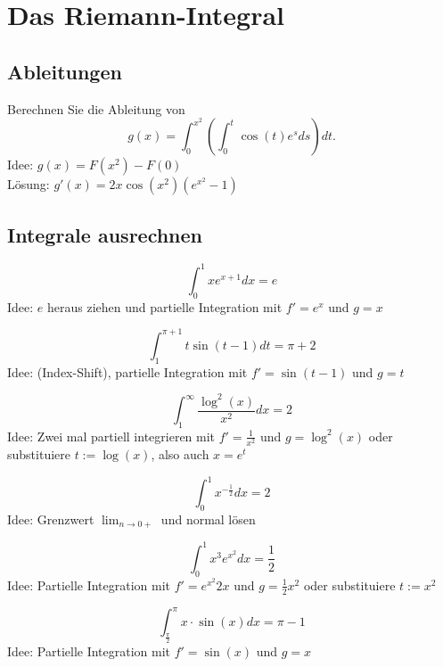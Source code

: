 \section{Das Riemann-Integral}

\subsection{Ableitungen}
Berechnen Sie die Ableitung von
\begin{displaymath}
  g(x) = \int_{0}^{x^2} \left(\int_{0}^{t} \cos(t)e^s ds\right)dt.
\end{displaymath}
Idee: $g(x) = F(x^2) - F(0)$\\
Lösung: $g'(x) = 2x \cos(x^2) \left(e^{x^2} - 1\right)$

\subsection{Integrale ausrechnen}
\begin{displaymath}
  \int_{0}^{1} xe^{x + 1} dx = e
\end{displaymath}
Idee: $e$ heraus ziehen und partielle Integration mit $f' = e^x$ und $g = x$

\begin{displaymath}            
  \int_{1}^{\pi + 1} t\sin(t - 1)dt = \pi + 2                                   
\end{displaymath}
Idee: (Index-Shift), partielle Integration mit $f' = \sin(t - 1)$ und $g = t$

\begin{displaymath}
  \int_{1}^{\infty} \frac{\log^2(x)}{x^2} dx = 2
\end{displaymath}
Idee: Zwei mal partiell integrieren mit $f' = \frac{1}{x^2}$ und $g = \log^2(x)$ oder substituiere $t := \log(x)$, also auch $x = e^t$

\begin{displaymath}
  \int_{0}^{1} x^{-\frac{1}{2}} dx = 2
\end{displaymath}
Idee: Grenzwert $\lim_{n \to 0+}$ und normal lösen

\begin{displaymath}
  \int_{0}^{1} x^3e^{x^2} dx = \frac{1}{2}
\end{displaymath}
Idee: Partielle Integration mit $f' = e^{x^2}2x$ und $g = \frac{1}{2}x^2$ oder substituiere $t := x^2$

\begin{displaymath}
  \int_{\frac{\pi}{2}}^{\pi} x \cdot \sin(x) dx = \pi - 1
\end{displaymath}
Idee: Partielle Integration mit $f' = \sin(x)$ und $g = x$


